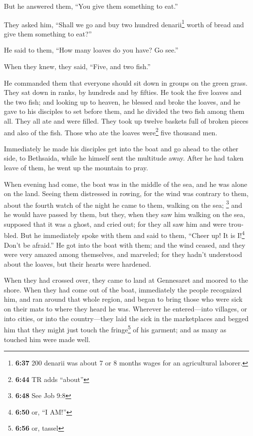\begin{paracol}{2}
\begin{otherlanguage}{english}
 But he answered them, ``You give them something to
eat.''

They asked him, ``Shall we go and buy two hundred denarii\footnote{\textbf{6:37}
  200 denarii was about 7 or 8 months wages for an agricultural laborer.}
worth of bread and give them something to eat?''

 He said to them, ``How many loaves do you have? Go
see.''

When they knew, they said, ``Five, and two fish.''

 He commanded them that everyone should sit down in
groups on the green grass.  They sat down in ranks, by
hundreds and by fifties.  He took the five loaves and the
two fish; and looking up to heaven, he blessed and broke the loaves, and
he gave to his disciples to set before them, and he divided the two fish
among them all.  They all ate and were filled.
 They took up twelve baskets full of broken pieces and
also of the fish.  Those who ate the loaves
were\footnote{\textbf{6:44} TR adds ``about''} five thousand men.

 Immediately he made his disciples get into the boat and
go ahead to the other side, to Bethsaida, while he himself sent the
multitude away.  After he had taken leave of them, he
went up the mountain to pray.

 When evening had come, the boat was in the middle of the
sea, and he was alone on the land.  Seeing them
distressed in rowing, for the wind was contrary to them, about the
fourth watch of the night he came to them, walking on the sea;
\footnote{\textbf{6:48} See Job 9:8} and he would have passed by them,
 but they, when they saw him walking on the sea, supposed
that it was a ghost, and cried out;  for they all saw him
and were troubled. But he immediately spoke with them and said to them,
``Cheer up! It is I!\footnote{\textbf{6:50} or, ``I AM!''} Don't be
afraid.''  He got into the boat with them; and the wind
ceased, and they were very amazed among themselves, and marveled;
 for they hadn't understood about the loaves, but their
hearts were hardened.

 When they had crossed over, they came to land at
Gennesaret and moored to the shore.  When they had come
out of the boat, immediately the people recognized him, 
and ran around that whole region, and began to bring those who were sick
on their mats to where they heard he was.  Wherever he
entered---into villages, or into cities, or into the country---they laid
the sick in the marketplaces and begged him that they might just touch
the fringe\footnote{\textbf{6:56} or, tassel} of his garment; and as
many as touched him were made well.


\end{otherlanguage}
\end{paracol}
